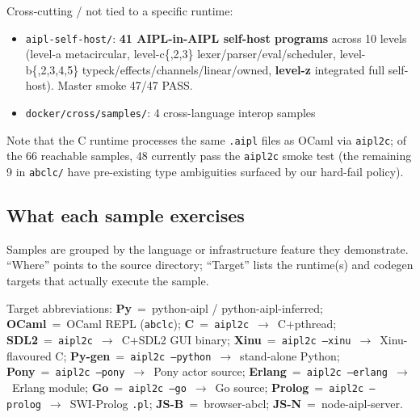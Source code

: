 \documentclass[10pt,a4paper,landscape]{article}
\begin{document}
\smallskip

\noindent
Cross-cutting / not tied to a specific runtime:
\begin{itemize}[leftmargin=*,itemsep=0pt]
  \item \texttt{aipl-self-host/}: \textbf{41 AIPL-in-AIPL self-host programs} across 10 levels (level-a metacircular, level-c\{,2,3\} lexer/parser/eval/scheduler, level-b\{,2,3,4,5\} typeck/effects/channels/linear/owned, \textbf{level-z} integrated full self-host).  Master smoke 47/47 PASS.
  \item \texttt{docker/cross/samples/}: 4 cross-language interop samples
\end{itemize}

Note that the C runtime processes the same \texttt{.aipl} files as
OCaml via \texttt{aipl2c}; of the 66 reachable samples, 48 currently
pass the \texttt{aipl2c} smoke test (the remaining 9 in \texttt{abclc/}
have pre-existing type ambiguities surfaced by our hard-fail policy).

\subsection*{What each sample exercises}

Samples are grouped by the language or infrastructure feature they
demonstrate.  ``Where'' points to the source directory;
``Target'' lists the runtime(s) and codegen targets that actually
execute the sample.

\smallskip

\noindent\small
Target abbreviations: \textbf{Py}~=~python-aipl /
python-aipl-inferred; \textbf{OCaml}~=~OCaml REPL (\texttt{abclc});
\textbf{C}~=~\texttt{aipl2c}~$\to$~C+pthread;
\textbf{SDL2}~=~\texttt{aipl2c}~$\to$~C+SDL2 GUI binary;
\textbf{Xinu}~=~\texttt{aipl2c~--xinu}~$\to$~Xinu-flavoured C;
\textbf{Py-gen}~=~\texttt{aipl2c~--python}~$\to$~stand-alone Python;
\textbf{Pony}~=~\texttt{aipl2c~--pony}~$\to$~Pony actor source;
\textbf{Erlang}~=~\texttt{aipl2c~--erlang}~$\to$~Erlang module;
\textbf{Go}~=~\texttt{aipl2c~--go}~$\to$~Go source;
\textbf{Prolog}~=~\texttt{aipl2c~--prolog}~$\to$~SWI-Prolog \texttt{.pl};
\textbf{JS-B}~=~browser-abcl; \textbf{JS-N}~=~node-aipl-server.
\normalsize
\end{document}
